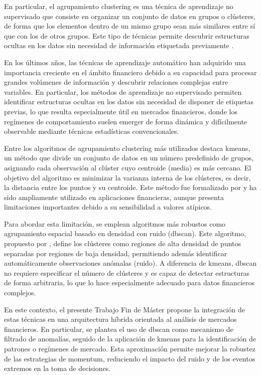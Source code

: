\documentclass[
]{article}
\begin{document}
	En particular, el agrupamiento  \gls{clustering} es una técnica de aprendizaje no supervisado que consiste en organizar un conjunto de datos en grupos o clústeres, de forma que los elementos dentro de un mismo grupo sean más similares entre sí que con los de otros grupos. Este tipo de técnicas permite descubrir estructuras ocultas en los datos sin necesidad de información etiquetada previamente \parencite{bishop2006}.
	
	En los últimos años, las técnicas de aprendizaje automático han adquirido una importancia creciente en el ámbito financiero debido a su capacidad para procesar grandes volúmenes de información y descubrir relaciones complejas entre variables. En particular, los métodos de aprendizaje no supervisado permiten identificar estructuras ocultas en los datos sin necesidad de disponer de etiquetas previas, lo que resulta especialmente útil en mercados financieros, donde los regímenes de comportamiento suelen emerger de forma dinámica y difícilmente observable mediante técnicas estadísticas convencionales.
	
	Entre los algoritmos de agrupamiento \gls{clustering} más utilizados destaca \gls{kmeans}, un método que divide un conjunto de datos en un número predefinido de grupos, asignando cada observación al clúster cuyo centroide (media) es más cercano. El objetivo del algoritmo es minimizar la varianza interna de los clústeres, es decir, la distancia entre los puntos y su centroide. Este método fue formalizado por \textcite{macqueen1967} y ha sido ampliamente utilizado en aplicaciones financieras, aunque presenta limitaciones importantes debido a su sensibilidad a valores atípicos.
	
	Para abordar esta limitación, se emplean algoritmos más robustos como agrupamiento espacial basado en densidad con ruido (\gls{dbscan}). Este algoritmo, propuesto por \textcite{ester1996}, define los clústeres como regiones de alta densidad de puntos separadas por regiones de baja densidad, permitiendo además identificar automáticamente observaciones anómalas (ruido). A diferencia de \gls{kmeans}, \gls{dbscan} no requiere especificar el número de clústeres y es capaz de detectar estructuras de forma arbitraria, lo que lo hace especialmente adecuado para datos financieros complejos.
	
	En este contexto, el presente Trabajo Fin de Máster propone la integración de estas técnicas en una arquitectura híbrida orientada al análisis de mercados financieros. En particular, se plantea el uso de \gls{dbscan} como mecanismo de filtrado de anomalías, seguido de la aplicación de \gls{kmeans} para la identificación de patrones o regímenes de mercado. Esta aproximación permite mejorar la robustez de las estrategias de \gls{momentum}, reduciendo el impacto del ruido y de los eventos extremos en la toma de decisiones.
	
\end{document}
